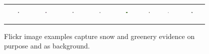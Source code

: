 \begin{figure}[t]
{\tiny{
\begin{center}
\begin{tabular}{@{}c@{\,\,\,}c@{\,\,\,}c@{\,\,\,}c@{\,\,\,}c@{\,\,\,}c@{\,\,\,}c@{\,\,\,}c@{\,\,\,}}
\includegraphics[width=0.05\textwidth, height=0.3in]{image/citysnow.jpg} &
\includegraphics[width=0.05\textwidth, height=0.3in]{image/citysnow2.jpg} &
\includegraphics[width=0.05\textwidth, height=0.3in]{image/dogsnow.jpg} &
\includegraphics[width=0.05\textwidth, height=0.3in]{image/humansnow.jpg} &
\includegraphics[width=0.05\textwidth, height=0.3in]{image/intentiongreen.jpg} &
\includegraphics[width=0.05\textwidth, height=0.3in]{image/waterfallgreen.jpg} &
\includegraphics[width=0.05\textwidth, height=0.3in]{image/dogtree.jpg} &
\includegraphics[width=0.05\textwidth, height=0.3in]{image/humantree.jpg} \\
\end{tabular}
\end{center}
}}
\caption{Flickr image examples capture snow and greenery evidence on purpose and as background.}
\label{fig:flickrexp}
\end{figure}



